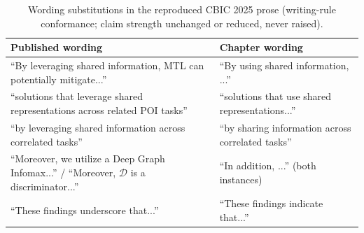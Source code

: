 \begin{table}[htb]
\caption{Wording substitutions in the reproduced CBIC 2025 prose (writing-rule
conformance; claim strength unchanged or reduced, never raised).}
\label{tab:apx:cbic-wording}
\centering
\small
\begin{tabular}{@{}p{}p{}@{}}
\toprule
\textbf{Published wording} & \textbf{Chapter wording} \\
\midrule
``By leveraging shared information, MTL can potentially mitigate...'' &
``By using shared information, ...'' \\
``solutions that leverage shared representations across related POI tasks'' &
``solutions that use shared representations...'' \\
``by leveraging shared information across correlated tasks'' &
``by sharing information across correlated tasks'' \\
``Moreover, we utilize a Deep Graph Infomax...'' /
``Moreover, $\mathcal{D}$ is a discriminator...'' &
``In addition, ...'' (both instances) \\
``These findings underscore that...'' &
``These findings indicate that...'' \\
%


\end{tabular}
\end{table}
